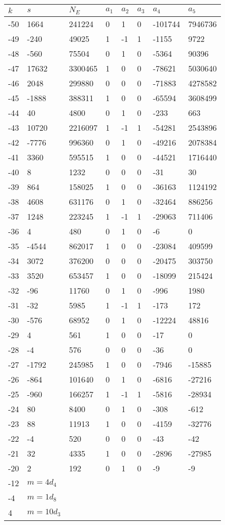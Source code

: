 \documentclass{amsart}
\begin{document}
\begin{longtable}{|l|l|l|lllll|}
\hline
$k$ & $s$ & $N_E$ & $a_1$ & $a_2$ & $a_3$ & $a_4$ & $a_5$\\
\hline
-50&1664&241224&0&1&0&-101744&7946736\\
-49&-240&49025&1&-1&1&-1155&9722\\
-48&-560&75504&0&1&0&-5364&90396\\
-47&17632&3300465&1&0&0&-78621&5030640\\
-46&2048&299880&0&0&0&-71883&4278582\\
-45&-1888&388311&1&0&0&-65594&3608499\\
-44&40&4800&0&1&0&-233&663\\
-43&10720&2216097&1&-1&1&-54281&2543896\\
-42&-7776&996360&0&1&0&-49216&2078384\\
-41&3360&595515&1&0&0&-44521&1716440\\
-40&8&1232&0&0&0&-31&30\\
-39&864&158025&1&0&0&-36163&1124192\\
-38&4608&631176&0&1&0&-32464&886256\\
-37&1248&223245&1&-1&1&-29063&711406\\
-36&4&480&0&1&0&-6&0\\
-35&-4544&862017&1&0&0&-23084&409599\\
-34&3072&376200&0&0&0&-20475&303750\\
-33&3520&653457&1&0&0&-18099&215424\\
-32&-96&11760&0&1&0&-996&1980\\
-31&-32&5985&1&-1&1&-173&172\\
-30&-576&68952&0&1&0&-12224&48816\\
-29&4&561&1&0&0&-17&0\\
-28&-4&576&0&0&0&-36&0\\
-27&-1792&245985&1&0&0&-7946&-15885\\
-26&-864&101640&0&1&0&-6816&-27216\\
-25&-960&166257&1&-1&1&-5816&-28934\\
-24&80&8400&0&1&0&-308&-612\\
-23&88&11913&1&0&0&-4159&-32776\\
-22&-4&520&0&0&0&-43&-42\\
-21&32&4335&1&0&0&-2896&-27985\\
-20&2&192&0&1&0&-9&-9\\
-12&$m=4d_{4}$&&\multicolumn{5}{c|}{}\\
-4&$m=1d_{8}$&&\multicolumn{5}{c|}{}\\
4&$m=10d_{3}$&&\multicolumn{5}{c|}{}\\
\hline
\end{longtable}
\end{document}
